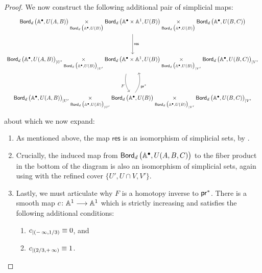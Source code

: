 \begin{proof}
    We now construct the following additional pair of simplicial maps:
    \begin{equation}
    \begin{tikzcd}
        \bord_d\big(\AA^{\bullet},U(A,B)\big)     
        \underset{\bord_d\big(\AA^\bullet,U(B)\big)}{\times} 
        \bord_d\big(\AA^{\bullet}\times \AA^1,U(B)\big) 
        \underset{\bord_d\big(\AA^\bullet,U(B)\big)}{\times} 
        \bord_d\big(\AA^{\bullet},U(B,C)\big) \ar[dd, "\mathsf{res}"] \\ \\
        \bord_d\big(\AA^{\bullet},U(A,B)\big)_{|U'}     
        \underset{\bord_d\big(\AA^\bullet,U(B)\big)_{|U'}}{\times} 
        \bord_d\big(\AA^{\bullet}\times \AA^1,U(B)\big) 
        \underset{\bord_d\big(\AA^\bullet,U(B)\big)_{|V'}}{\times} 
        \bord_d\big(\AA^{\bullet},U(B,C)\big)_{|V'} \ar[dd, bend right=25, "F"', shorten <=2pt, shorten >=2pt]   \\ \\ 
        \bord_d\big(\AA^{\bullet},U(A,B)\big)_{|U'}     
        \underset{\bord_d\big(\AA^\bullet,U(B)\big)_{|U'}}{\times} 
        \bord_d\big(\AA^{\bullet},U(B)\big) 
        \underset{\bord_d\big(\AA^\bullet,U(B)\big)_{|V'}}{\times} 
        \bord_d\big(\AA^{\bullet},U(B,C)\big)_{|V'} \ar[uu, bend right=25, "\pr^\ast"']      
    \end{tikzcd}
    \end{equation}
    about which we now expand:
    \begin{enumerate}
        \item As mentioned above, the map $\mathsf{res}$ is an isomorphism of simplicial sets, by .
        \item Crucially, the induced map from $\operatorname{\mathsf{Bord}}_d\big(\mathbb A^\bullet, U(A,B,C)\big)$ to the fiber product in the bottom of the diagram is also an isomorphism of simplicial sets, again using  with the refined cover $\{U',U\cap V,V'\}$.
        \item Lastly, we must articulate why $F$ is a homotopy inverse to $\mathsf{pr}^\ast$. There is a smooth map $c\colon \mathbb A^1 \longrightarrow \mathbb A^1$ which is strictly increasing and satisfies the following additional conditions: 
        \begin{enumerate}
        \item $c_{|(-\operatorname{\infty},1/3)} \equiv 0$, and 
        \item $c_{|(2/3,+\operatorname{\infty})} \equiv 1$. 
        \end{enumerate}

\end{enumerate}
\end{proof}
